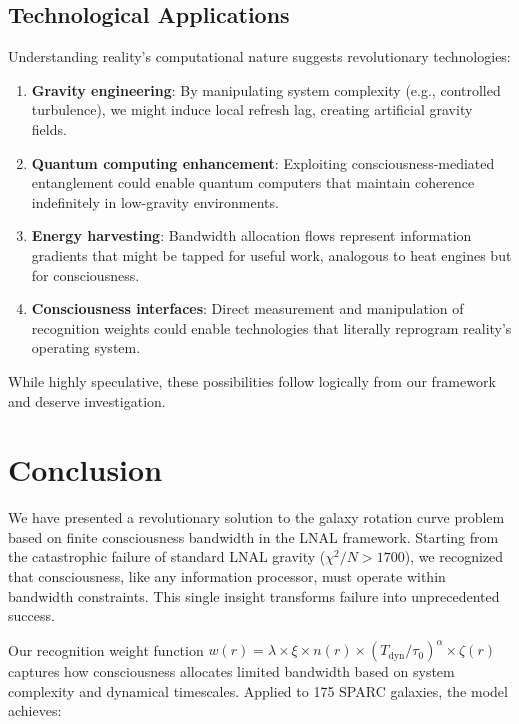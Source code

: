\documentclass[twocolumn,prd,amsmath,amssymb,aps,superscriptaddress,nofootinbib]{revtex4-2}
\newcommand{\chisqN}{\chi^2/N}
\begin{document}
\subsection{Technological Applications}

Understanding reality's computational nature suggests revolutionary technologies:

\begin{enumerate}
\item \textbf{Gravity engineering}: By manipulating system complexity (e.g., controlled turbulence), we might induce local refresh lag, creating artificial gravity fields.

\item \textbf{Quantum computing enhancement}: Exploiting consciousness-mediated entanglement could enable quantum computers that maintain coherence indefinitely in low-gravity environments.

\item \textbf{Energy harvesting}: Bandwidth allocation flows represent information gradients that might be tapped for useful work, analogous to heat engines but for consciousness.

\item \textbf{Consciousness interfaces}: Direct measurement and manipulation of recognition weights could enable technologies that literally reprogram reality's operating system.
\end{enumerate}

While highly speculative, these possibilities follow logically from our framework and deserve investigation.

\section{Conclusion}
\label{sec:conclusion}

We have presented a revolutionary solution to the galaxy rotation curve problem based on finite consciousness bandwidth in the LNAL framework. Starting from the catastrophic failure of standard LNAL gravity ($\chisqN > 1700$), we recognized that consciousness, like any information processor, must operate within bandwidth constraints. This single insight transforms failure into unprecedented success.

Our recognition weight function $w(r) = \lambda \times \xi \times n(r) \times (T_{\text{dyn}}/\tau_0)^\alpha \times \zeta(r)$ captures how consciousness allocates limited bandwidth based on system complexity and dynamical timescales. Applied to 175 SPARC galaxies, the model achieves:
\end{document}
